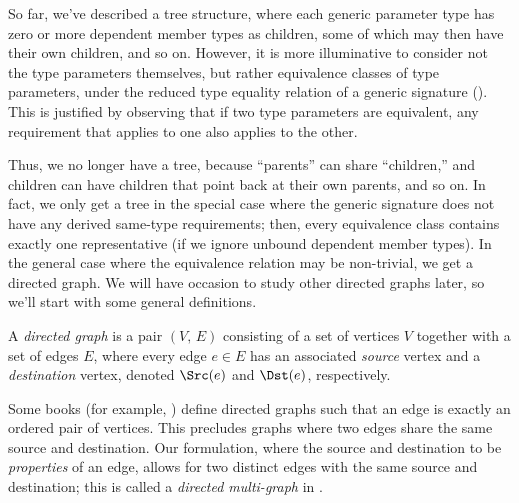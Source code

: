 \documentclass[../generics]{subfiles}
\begin{document}
So far, we've described a tree structure, where each generic parameter type has zero or more dependent member types as children, some of which may then have their own children, and so on. However, it is more illuminative to consider not the type parameters themselves, but rather equivalence classes of type parameters, under the reduced type equality relation of a generic signature (). This is justified by observing that if two type parameters are equivalent, any requirement that applies to one also applies to the other.

Thus, we no longer have a tree, because ``parents'' can share ``children,'' and children can have children that point back at their own parents, and so on. In fact, we only get a tree in the special case where the generic signature does not have any derived same-type requirements; then, every equivalence class contains exactly one representative (if we ignore unbound dependent member types). In the general case where the equivalence relation may be non-trivial, we get a directed graph. We will have occasion to study other directed graphs later, so we'll start with some general definitions.

\begin{definition}
A \emph{directed graph} is a pair $(V,\, E)$ consisting of a set of vertices $V$ together with a set of edges $E$, where every edge $e\in E$ has an associated \emph{source} vertex and a \emph{destination} vertex, denoted $\Src(e)$ and $\Dst(e)$, respectively.

Some books (for example, \cite{grimaldi}) define directed graphs such that an edge is exactly an ordered pair of vertices. This precludes graphs where two edges share the same source and destination. Our formulation, where the source and destination to be \emph{properties} of an edge, allows for two distinct edges with the same source and destination; this is called a \emph{directed multi-graph} in \cite{alggraph}.
\end{definition}
\end{document}
